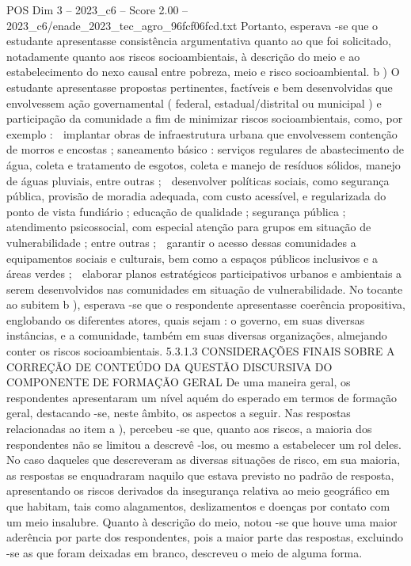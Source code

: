 \begin{textsample}{POS Dim 3 – 2023\_c6 – Score 2.00 – 2023\_c6/enade\_2023\_tec\_agro\_96fcf06fcd.txt}
Portanto, esperava -se que o estudante apresentasse consistência argumentativa quanto ao que foi solicitado, notadamente quanto aos riscos socioambientais, à descrição do meio e ao estabelecimento do nexo causal entre pobreza, meio e risco socioambiental. b ) O estudante apresentasse propostas pertinentes, factíveis e bem desenvolvidas que envolvessem ação governamental ( federal, estadual/distrital ou municipal ) e participação da comunidade a fim de minimizar riscos socioambientais, como, por exemplo :  implantar obras de infraestrutura urbana que envolvessem contenção de morros e encostas ; saneamento básico : serviços regulares de abastecimento de água, coleta e tratamento de esgotos, coleta e manejo de resíduos sólidos, manejo de águas pluviais, entre outras ;  desenvolver políticas sociais, como segurança pública, provisão de moradia adequada, com custo acessível, e regularizada do ponto de vista fundiário ; educação de qualidade ; segurança pública ; atendimento psicossocial, com especial atenção para grupos em situação de vulnerabilidade ; entre outras ;  garantir o acesso dessas comunidades a equipamentos sociais e culturais, bem como a espaços públicos inclusivos e a áreas verdes ;  elaborar planos estratégicos participativos urbanos e ambientais a serem desenvolvidos nas comunidades em situação de vulnerabilidade.
No tocante ao subitem b ), esperava -se que o respondente apresentasse coerência propositiva, englobando os diferentes atores, quais sejam : o governo, em suas diversas instâncias, e a comunidade, também em suas diversas organizações, almejando conter os riscos socioambientais. 5.3.1.3 CONSIDERAÇÕES FINAIS SOBRE A CORREÇÃO DE CONTEÚDO DA QUESTÃO DISCURSIVA DO COMPONENTE DE FORMAÇÃO GERAL De uma maneira geral, os respondentes apresentaram um nível aquém do esperado em termos de formação geral, destacando -se, neste âmbito, os aspectos a seguir.
Nas respostas relacionadas ao item a ), percebeu -se que, quanto aos riscos, a maioria dos respondentes não se limitou a descrevê -los, ou mesmo a estabelecer um rol deles.
No caso daqueles que descreveram as diversas situações de risco, em sua maioria, as respostas se enquadraram naquilo que estava previsto no padrão de resposta, apresentando os riscos derivados da insegurança relativa ao meio geográfico em que habitam, tais como alagamentos, deslizamentos e doenças por contato com um meio insalubre.
Quanto à descrição do meio, notou -se que houve uma maior aderência por parte dos respondentes, pois a maior parte das respostas, excluindo -se as que foram deixadas em branco, descreveu o meio de alguma forma.

\end{textsample}
